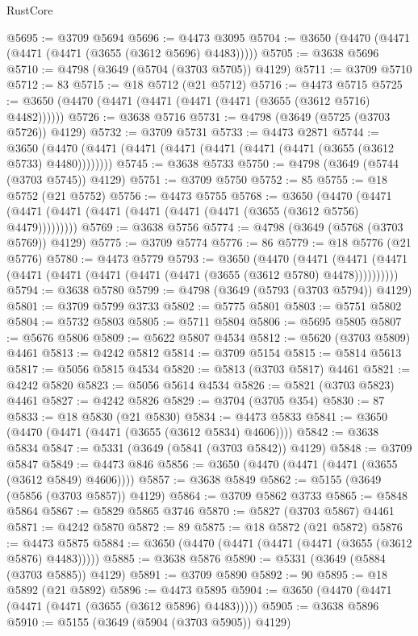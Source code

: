 \begin{lexlean}{RustCore}
\begin{coremodule}
@5695 := @3709 @5694
@5696 := @4473 @3095
@5704 := @3650 (@4470 (@4471 (@4471 (@4471 (@3655 (@3612 @5696) @4483)))))
@5705 := @3638 @5696
@5710 := @4798 (@3649 (@5704 (@3703 @5705)) @4129)
@5711 := @3709 @5710
@5712 := 83
@5715 := @18 @5712 (@21 @5712)
@5716 := @4473 @5715
@5725 := @3650 (@4470 (@4471 (@4471 (@4471 (@4471 (@3655 (@3612 @5716) @4482))))))
@5726 := @3638 @5716
@5731 := @4798 (@3649 (@5725 (@3703 @5726)) @4129)
@5732 := @3709 @5731
@5733 := @4473 @2871
@5744 := @3650 (@4470 (@4471 (@4471 (@4471 (@4471 (@4471 (@4471 (@3655 (@3612 @5733) @4480))))))))
@5745 := @3638 @5733
@5750 := @4798 (@3649 (@5744 (@3703 @5745)) @4129)
@5751 := @3709 @5750
@5752 := 85
@5755 := @18 @5752 (@21 @5752)
@5756 := @4473 @5755
@5768 := @3650
    (@4470 (@4471 (@4471 (@4471 (@4471 (@4471 (@4471 (@4471 (@3655 (@3612 @5756) @4479)))))))))
@5769 := @3638 @5756
@5774 := @4798 (@3649 (@5768 (@3703 @5769)) @4129)
@5775 := @3709 @5774
@5776 := 86
@5779 := @18 @5776 (@21 @5776)
@5780 := @4473 @5779
@5793 := @3650
    (@4470
      (@4471 (@4471 (@4471 (@4471 (@4471 (@4471 (@4471 (@4471 (@3655 (@3612 @5780) @4478))))))))))
@5794 := @3638 @5780
@5799 := @4798 (@3649 (@5793 (@3703 @5794)) @4129)
@5801 := @3709 @5799 @3733
@5802 := @5775 @5801
@5803 := @5751 @5802
@5804 := @5732 @5803
@5805 := @5711 @5804
@5806 := @5695 @5805
@5807 := @5676 @5806
@5809 := @5622 @5807 @4534
@5812 := @5620 (@3703 @5809) @4461
@5813 := @4242 @5812
@5814 := @3709 @5154
@5815 := @5814 @5613
@5817 := @5056 @5815 @4534
@5820 := @5813 (@3703 @5817) @4461
@5821 := @4242 @5820
@5823 := @5056 @5614 @4534
@5826 := @5821 (@3703 @5823) @4461
@5827 := @4242 @5826
@5829 := @3704 (@3705 @354)
@5830 := 87
@5833 := @18 @5830 (@21 @5830)
@5834 := @4473 @5833
@5841 := @3650 (@4470 (@4471 (@4471 (@3655 (@3612 @5834) @4606))))
@5842 := @3638 @5834
@5847 := @5331 (@3649 (@5841 (@3703 @5842)) @4129)
@5848 := @3709 @5847
@5849 := @4473 @846
@5856 := @3650 (@4470 (@4471 (@4471 (@3655 (@3612 @5849) @4606))))
@5857 := @3638 @5849
@5862 := @5155 (@3649 (@5856 (@3703 @5857)) @4129)
@5864 := @3709 @5862 @3733
@5865 := @5848 @5864
@5867 := @5829 @5865 @3746
@5870 := @5827 (@3703 @5867) @4461
@5871 := @4242 @5870
@5872 := 89
@5875 := @18 @5872 (@21 @5872)
@5876 := @4473 @5875
@5884 := @3650 (@4470 (@4471 (@4471 (@4471 (@3655 (@3612 @5876) @4483)))))
@5885 := @3638 @5876
@5890 := @5331 (@3649 (@5884 (@3703 @5885)) @4129)
@5891 := @3709 @5890
@5892 := 90
@5895 := @18 @5892 (@21 @5892)
@5896 := @4473 @5895
@5904 := @3650 (@4470 (@4471 (@4471 (@4471 (@3655 (@3612 @5896) @4483)))))
@5905 := @3638 @5896
@5910 := @5155 (@3649 (@5904 (@3703 @5905)) @4129)

\end{coremodule}
\end{lexlean}
